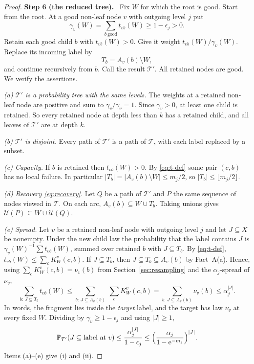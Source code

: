 \documentclass[11pt]{article}
\numberwithin{equation}{section}
\newcommand{\PP}{\mathbb P}
\newcommand{\TT}{\mathcal T}
\newcommand{\UU}{\mathcal U}
\newcommand{\ee}{\mathrm e}
\newcommand{\step}[2]{\medskip\noindent\textbf{Step #1 (#2).}\ }
\begin{document}
\begin{proof}
\step{6}{the reduced tree}
Fix $W$ for which the root is good. Start from the root. At a good
non-leaf node $v$ with outgoing level $j$ put
\[
 \gamma_v(W)=\sum_{b\ \mathrm{good}}t_{vb}(W)\ge1-\epsilon_j>0 .
\]
Retain each good child $b$ with $t_{vb}(W)>0$. Give it weight
$t_{vb}(W)/\gamma_v(W)$. Replace its incoming label by
\[
 T_b=A_v(b)\setminus W,
\]
and continue recursively from $b$. Call the result $\TT'$. All
retained nodes are good. We verify the assertions.

\emph{(a) $\TT'$ is a probability tree with the same levels.} The
weights at a retained non-leaf node are positive and sum to
$\gamma_v/\gamma_v=1$. Since $\gamma_v>0$, at least one child is
retained. So every retained node at depth less than $k$ has a retained
child, and all leaves of $\TT'$ are at depth $k$.

\emph{(b) $\TT'$ is disjoint.} Every path of $\TT'$ is a path of
$\TT$, with each label replaced by a subset.

\emph{(c) Capacity.} If $b$ is retained then $t_{vb}(W)>0$. By
\eqref{eq:t-def} some pair $(c,b)$ has no local failure. In particular
$|T_b|=|A_v(b)\setminus W|\le m_j/2$, so
$|T_b|\le\lfloor m_j/2\rfloor$.

\emph{(d) Recovery \eqref{eq:recovery}.} Let $Q$ be a path of $\TT'$
and $P$ the same sequence of nodes viewed in $\TT$. On each arc,
$A_v(b)\subseteq W\cup T_b$. Taking unions gives
$\UU(P)\subseteq W\cup\UU(Q)$.

\emph{(e) Spread.} Let $v$ be a retained non-leaf node with outgoing
level $j$ and let $J\subseteq X$ be nonempty. Under the new child law
the probability that the label contains $J$ is
$\gamma_v(W)^{-1}\sum t_{vb}(W)$, summed over retained $b$ with
$J\subseteq T_b$. By \eqref{eq:t-def},
$t_{vb}(W)\le\sum_cK^v_W(c,b)$. If $J\subseteq T_b$, then
$J\subseteq T_b\subseteq A_v(b)$ by Fact~A(a). Hence, using
$\sum_cK^v_W(c,b)=\nu_v(b)$ from Section~\ref{sec:resampling} and the
$\alpha_j$-spread of $\nu_v$,
\[
 \sum_{b:\,J\subseteq T_b}t_{vb}(W)
 \le\sum_{b:\,J\subseteq A_v(b)}\ \sum_{c}K^v_W(c,b)
 =\sum_{b:\,J\subseteq A_v(b)}\nu_v(b)\le\alpha_j^{|J|}.
\]
In words, the fragment lies inside the \emph{target} label, and the
target has law $\nu_v$ at every fixed $W$. Dividing by
$\gamma_v\ge1-\epsilon_j$ and using $|J|\ge1$,
\[
 \PP_{\TT'}(J\subseteq\text{label at }v)
 \le\frac{\alpha_j^{|J|}}{1-\epsilon_j}
 \le\Bigl(\frac{\alpha_j}{1-\ee^{-m_j}}\Bigr)^{|J|}.
\]
Items (a)--(e) give (i) and (ii).
\end{proof}
\end{document}

